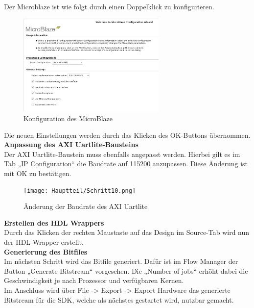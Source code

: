   Der Microblaze ist wie folgt durch einen Doppelklick zu konfigurieren.

\begin{figure}[H]
\centering
\includegraphics[width=0.65\textwidth]{Hauptteil/microkonf.png}
\caption{Konfiguration des MicroBlaze}\label{fig:mbschritt9}
\end{figure}
Die neuen Einstellungen werden durch das Klicken des OK-Buttons übernommen.\\

\textbf{Anpassung des AXI Uartlite-Bausteins}\\

Der AXI Uartlite-Baustein muss ebenfalls angepasst werden. Hierbei gilt es im Tab „IP Configuration“ die Baudrate auf 115200 anzupassen.
Diese Änderung ist mit OK zu bestätigen.\\

\begin{figure}[H]
\centering
\texttt{[image: Hauptteil/Schritt10.png]}
\caption{Änderung der Baudrate des AXI Uartlite}\label{fig:mbschritt10}
\end{figure}

\vspace{10mm}

\textbf{Erstellen des HDL Wrappers}\\

Durch das Klicken der rechten Maustaste auf das Design im Source-Tab wird nun der HDL Wrapper erstellt.\\

\textbf{Generierung des Bitfiles}\\

Im nächsten Schritt wird das Bitfile generiert. Dafür ist im Flow Manager der Button „Generate Bitstream“ vorgesehen.
 Die „Number of jobs“ erhöht dabei die Geschwindigkeit je nach Prozessor und verfügbaren Kernen.\\
 Im Anschluss wird über File -> Export -> Export Hardware das generierte Bitstream für die SDK, welche als nächstes gestartet wird, nutzbar gemacht.\\


